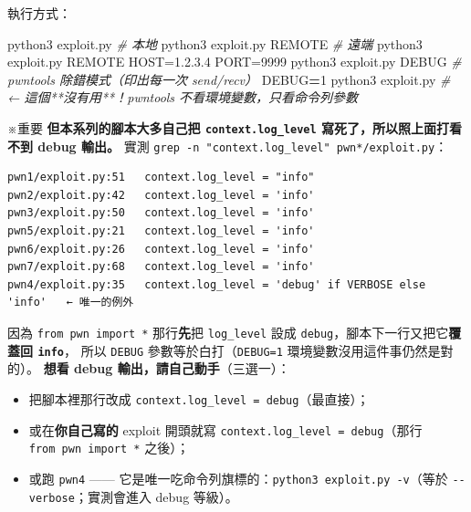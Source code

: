 \documentclass[10pt,a4paper]{article}
\newenvironment{Shaded}{\begin{snugshade}}{\end{snugshade}}
\newcommand{\CommentTok}[1]{\textcolor[rgb]{0.56,0.35,0.01}{\textit{#1}}}
\newcommand{\ExtensionTok}[1]{#1}
\newcommand{\NormalTok}[1]{#1}
\newcommand{\OperatorTok}[1]{\textcolor[rgb]{0.81,0.36,0.00}{\textbf{#1}}}
\newcommand{\VariableTok}[1]{\textcolor[rgb]{0.00,0.00,0.00}{#1}}
\renewenvironment{Shaded}{%
  \def\FrameCommand{\fboxsep=3.2pt\colorbox{shadecolor}}%
  \MakeFramed{\advance\hsize-\width\FrameRestore\small}%
}{%
  \endMakeFramed
}
\providecommand{\tightlist}{%
  \setlength{\itemsep}{0pt}\setlength{\parskip}{0pt}}
\renewenvironment{quote}{%
  \begin{mdframed}[linewidth=0pt,innerleftmargin=0pt,innerrightmargin=0pt,
    innerbottommargin=0pt,innertopmargin=0pt,skipabove=0.55em,skipbelow=0.55em,
    leftmargin=0.9em,rightmargin=0.4em,startcode={\color{quotebar}\vrule width 2.6pt},%
    endcode={}]%
  \itshape\color{black}%
}{%
  \end{mdframed}%
}
\begin{document}
執行方式：

\begin{Shaded}
\begin{Highlighting}[]
\ExtensionTok{python3}\NormalTok{ exploit.py             }\CommentTok{\# 本地}
\ExtensionTok{python3}\NormalTok{ exploit.py REMOTE      }\CommentTok{\# 遠端}
\ExtensionTok{python3}\NormalTok{ exploit.py REMOTE HOST=1.2.3.4 PORT=9999}
\ExtensionTok{python3}\NormalTok{ exploit.py DEBUG       }\CommentTok{\# pwntools 除錯模式（印出每一次 send/recv）}
\VariableTok{DEBUG}\OperatorTok{=}\NormalTok{1 }\ExtensionTok{python3}\NormalTok{ exploit.py     }\CommentTok{\# ← 這個**沒有用**！pwntools 不看環境變數，只看命令列參數}
\end{Highlighting}
\end{Shaded}

\begin{quote}
※重要 \textbf{但本系列的腳本大多自己把 \texttt{context.\allowbreak{}log\_\allowbreak{}level}
寫死了，所以照上面打看不到 debug 輸出。} 實測
\texttt{grep\ \allowbreak{}-\allowbreak{}n\ \allowbreak{}"context.\allowbreak{}log\_\allowbreak{}level"\ \allowbreak{}pwn*/\allowbreak{}exploit.\allowbreak{}py}：

\begin{Verbatim}[breaklines=true,breakanywhere=true,breakautoindent=false,fontsize=\fontsize{7.0}{9.5}\selectfont]
pwn1/exploit.py:51   context.log_level = "info"
pwn2/exploit.py:42   context.log_level = 'info'
pwn3/exploit.py:50   context.log_level = 'info'
pwn5/exploit.py:21   context.log_level = 'info'
pwn6/exploit.py:26   context.log_level = 'info'
pwn7/exploit.py:68   context.log_level = 'info'
pwn4/exploit.py:35   context.log_level = 'debug' if VERBOSE else 'info'   ← 唯一的例外
\end{Verbatim}

因為 \texttt{from\ \allowbreak{}pwn\ \allowbreak{}import\ \allowbreak{}*} 那行\textbf{先}把 \texttt{log\_\allowbreak{}level}
設成 \texttt{debug}，腳本下一行又把它\textbf{覆蓋回 \texttt{info}}，
所以 \texttt{DEBUG} 參數等於白打（\texttt{DEBUG=1}
環境變數沒用這件事仍然是對的）。 \textbf{想看 debug
輸出，請自己動手}（三選一）：

\begin{itemize}
\tightlist
\item
  把腳本裡那行改成
  \texttt{context.\allowbreak{}log\_\allowbreak{}level\ \allowbreak{}=\ \allowbreak{}\textquotesingle{}\allowbreak{}debug\textquotesingle{}\allowbreak{}}（最直接）；
\item
  或在\textbf{你自己寫的} exploit 開頭就寫
  \texttt{context.\allowbreak{}log\_\allowbreak{}level\ \allowbreak{}=\ \allowbreak{}\textquotesingle{}\allowbreak{}debug\textquotesingle{}\allowbreak{}}（那行
  \texttt{from\ \allowbreak{}pwn\ \allowbreak{}import\ \allowbreak{}*} 之後）；
\item
  或跑 \texttt{pwn4} ------
  它是唯一吃命令列旗標的：\texttt{python3\ \allowbreak{}exploit.\allowbreak{}py\ \allowbreak{}-\allowbreak{}v}（等於
  \texttt{-\allowbreak{}\/\allowbreak{}-\allowbreak{}verbose}；實測會進入 debug 等級）。
\end{itemize}
\end{quote}
\end{document}

